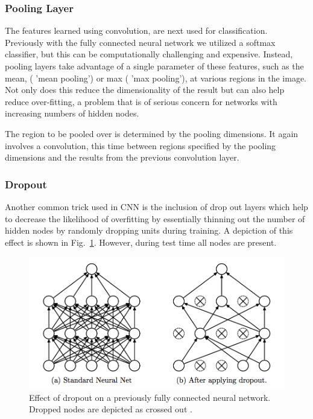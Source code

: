 \documentclass[12pt, twocolumn]{article}
\begin{document}
\subsubsection{Pooling Layer}
The features learned using convolution, are next used for classification. Previously with the fully connected neural network we utilized a softmax classifier, but this can be computationally challenging and expensive. Instead, pooling layers take advantage of a single parameter of these features, such as the mean, ( 'mean pooling') or max ( 'max pooling'), at  various regions in the image. Not only does this reduce the dimensionality of the result but can also help reduce over-fitting, a problem that is of serious concern for networks with increasing numbers of hidden nodes. 

The region to be pooled over is determined by the pooling dimensions. It again involves a convolution, this time between regions specified by the pooling dimensions and the results from the previous convolution layer. 

\subsubsection{Dropout}

Another common trick used in CNN is the inclusion of drop out layers which help to decrease the likelihood of overfitting by essentially thinning out the number of hidden nodes by randomly dropping units during training.  A depiction of this effect is shown in Fig.~\ref{fig:dropout}. However, during test time all nodes are present. 
\begin{figure}
\includegraphics[scale=.5]{dropout.png}

\caption{Effect of dropout on a previously fully connected neural network. Dropped nodes are depicted as crossed out \cite{Dropout}. }
\label{fig:dropout}
\end{figure}
\end{document}
